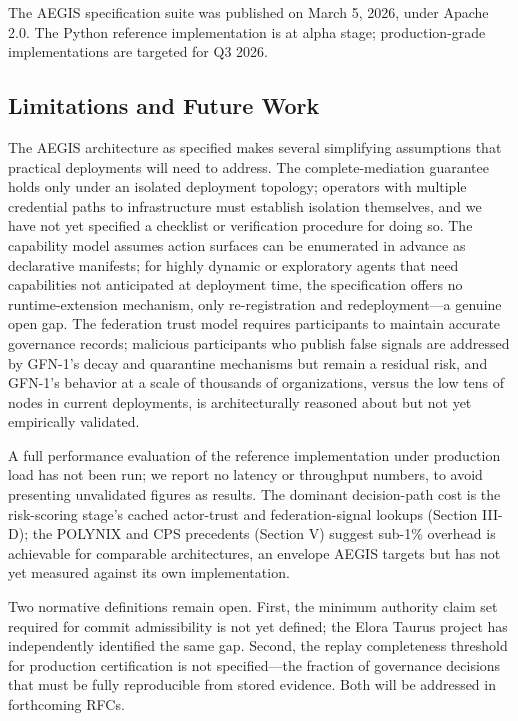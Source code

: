 \documentclass{IEEEcsmag}
\begin{document}
The AEGIS specification suite was published on March 5, 2026, under Apache 2.0. The Python reference implementation is at alpha stage; production-grade implementations are targeted for Q3 2026.

\subsection{Limitations and Future Work}

The AEGIS architecture as specified makes several simplifying assumptions that practical deployments will need to address. The complete-mediation guarantee holds only under an isolated deployment topology; operators with multiple credential paths to infrastructure must establish isolation themselves, and we have not yet specified a checklist or verification procedure for doing so. The capability model assumes action surfaces can be enumerated in advance as declarative manifests; for highly dynamic or exploratory agents that need capabilities not anticipated at deployment time, the specification offers no runtime-extension mechanism, only re-registration and redeployment---a genuine open gap. The federation trust model requires participants to maintain accurate governance records; malicious participants who publish false signals are addressed by GFN-1's decay and quarantine mechanisms but remain a residual risk, and GFN-1's behavior at a scale of thousands of organizations, versus the low tens of nodes in current deployments, is architecturally reasoned about but not yet empirically validated.

A full performance evaluation of the reference implementation under production load has not been run; we report no latency or throughput numbers, to avoid presenting unvalidated figures as results. The dominant decision-path cost is the risk-scoring stage's cached actor-trust and federation-signal lookups (Section III-D); the POLYNIX and CPS precedents (Section V) suggest sub-1\% overhead is achievable for comparable architectures, an envelope AEGIS targets but has not yet measured against its own implementation.

Two normative definitions remain open. First, the minimum authority claim set required for commit admissibility is not yet defined; the Elora Taurus project has independently identified the same gap. Second, the replay completeness threshold for production certification is not specified---the fraction of governance decisions that must be fully reproducible from stored evidence. Both will be addressed in forthcoming RFCs.
\end{document}
